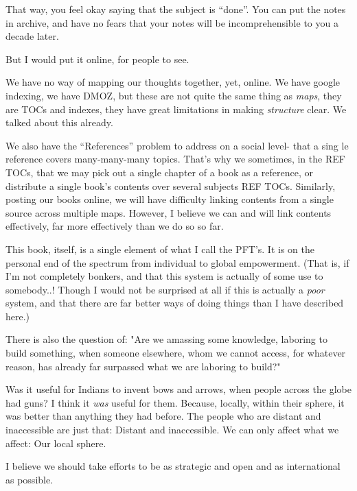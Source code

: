 \documentclass[oneside]{book}
\begin{document}
That way, you feel okay saying that the subject is ``done''. You can put
the notes in archive, and have no fears that your notes will be
incomprehensible to you a decade later.

But I would put it online, for people to see.

We have no way of mapping our thoughts together, yet, online. We have
google indexing, we have DMOZ, but these are not quite the same thing
as \emph{maps}, they are TOCs and indexes, they have great limitations in
making \emph{structure} clear. We talked about this already.

We also have the ``References'' problem to address on a social level- that a sing
le
reference covers many-many-many topics. That's why we sometimes, in
the REF TOCs, that we may pick out a single chapter of a book as a
reference, or distribute a single book's contents over several
subjects REF TOCs. Similarly, posting our books online, we will have
difficulty linking contents from a single source across multiple
maps. However, I believe we can and will link contents effectively,
far more effectively than we do so so far.

This book, itself, is a single element of what I call the PFT's. It is
on the personal end of the spectrum from individual to global
empowerment. (That is, if I'm not completely bonkers, and that this
system is actually of some use to somebody..! Though I would not be
surprised at all if this is actually a \emph{poor} system, and that there
are far better ways of doing things than I have described here.)

There is also the question of: "Are we amassing some knowledge,
laboring to build something, when someone elsewhere, whom we cannot
access, for whatever reason, has already far surpassed what we are
laboring to build?"

Was it useful for Indians to invent bows and arrows, when people across
the globe had guns? I think it \emph{was} useful for them. Because,
locally, within their sphere, it was better than anything they had
before. The people who are distant and inaccessible are just that:
Distant and inaccessible. We can only affect what we affect: Our local
sphere.

I believe we should take efforts to be as strategic and open and as
international as possible.
\end{document}
